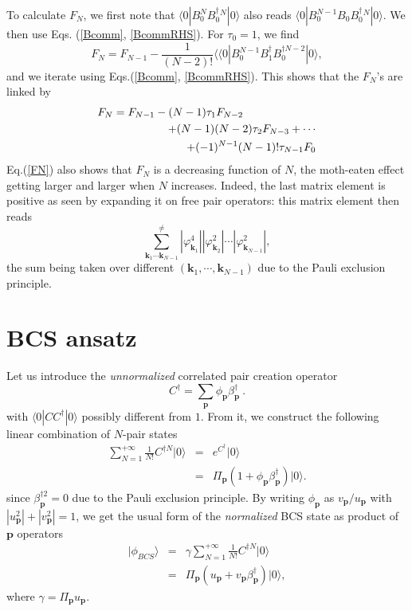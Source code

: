 \documentclass[twocolumn,showpacs]{revtex4}
\def\v#1{\mathbf{#1}}
\begin{document}
To calculate $F_N$, we first note that 
$\langle 0|{B_0^N}B_0^{\dag}{}^{ N}|0\rangle$ also reads $\langle 0|B_0^{N-1}B_0B_0^{\dag}{}^ N|0\rangle$. We then use Eqs. (\ref{Bcomm}, \ref{BcommRHS}). For $\tau_0=1$, we find 
\begin{equation}\label{FN}
F_N=F_{N-1}-\frac{1}{(N-2)!}\langle\langle 0|B_0^{N-1}B_1^\dag B_0^{\dag N-2}|0\rangle,
\end{equation}
and we iterate using Eqs.(\ref{Bcomm}, \ref{BcommRHS}). This shows that the $F_N$'s are linked by
\begin{eqnarray}
F_N=F_{N-1}-(N-1)\tau_1F_{N-2}\hspace{2.3cm}\nonumber\\
+(N-1)(N-2)\tau_2F_{N-3}+\cdots\nonumber\\
+(-1)^{N-1}(N-1)!\tau_{N-1}F_0
\end{eqnarray}
Eq.(\ref{FN}) also shows that $F_N$ is a decreasing function of $N$, the moth-eaten effect getting larger and larger when $N$ increases. Indeed, the last matrix element is positive as seen by expanding it on free pair operators: this matrix element then reads
\begin{equation}
\sum_{\v k_1\cdots \v k_{N-1}}^{\neq}|\varphi_{\v k_1}^4||\varphi_{\v k_2}^2|\cdots|\varphi_{\v k_{N-1}}^2|,
\end{equation}
the sum being taken over different $(\v k_1,\cdots,\v k_{N-1})$ due to the Pauli exclusion principle.

\section{BCS ansatz}

Let us introduce the \emph{unnormalized} correlated pair creation operator
\begin{equation}\label{C}
C^\dag=\sum_{\v p}\phi_{\v p}\beta_{\v p}^\dag\ .
\end{equation}
with $\langle 0|CC^{\dag }|0\rangle$ possibly different from $1$. From it,  we construct the following linear combination of $N$-pair states
\begin{eqnarray}
\sum_{N=1}^{+\infty}\frac{1}{N!}C^{\dag N}|0\rangle&=&e^{C^\dag}|0\rangle\nonumber\\
&=&\Pi_{\v p}(1+\phi_{\v p}\beta_{\v p}^\dag)|0\rangle.
\end{eqnarray}
since $\beta_{\v p}^{\dag 2}=0$ due to the Pauli exclusion principle. By writing $\phi_{\v p}$ as $v_{\v p}/u_{\v p}$ with $|u_{\v p}^2|+|v_{\v p}^2|=1$, we get the usual form of the \emph{normalized} BCS state as product of $\v p$ operators
\begin{eqnarray}
|\phi_{BCS}\rangle&=&\gamma\sum_{N=1}^{+\infty}\frac{1}{N!}C^{\dag N}|0\rangle\nonumber\\
&=&\Pi_{\v p}(u_{\v p}+v_{\v p}\beta_{\v p}^\dag)|0\rangle,
\end{eqnarray}
where $\gamma=\Pi_{\v p}u_{\v p}$.
\end{document}
